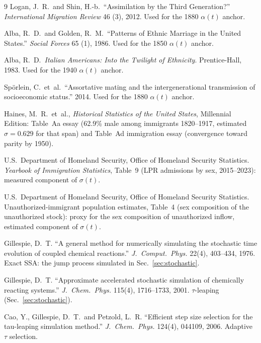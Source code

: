 \documentclass[11pt,a4paper]{article}
\begin{document}
{\begin{thebibliography}{9}
Logan, J.\ R.\ and Shin, H.-b.\ ``Assimilation by the Third
Generation?'' \textit{International Migration Review} 46 (3), 2012.
Used for the 1880 $\alpha(t)$ anchor.

Alba, R.\ D.\ and Golden, R.\ M.\ ``Patterns of Ethnic Marriage in the
United States.'' \textit{Social Forces} 65 (1), 1986. Used for the 1850
$\alpha(t)$ anchor.

Alba, R.\ D.\ \textit{Italian Americans: Into the Twilight of
Ethnicity}. Prentice-Hall, 1983. Used for the 1940 $\alpha(t)$ anchor.

Sp\"orlein, C.\ et~al.\ ``Assortative mating and the intergenerational
transmission of socioeconomic status.'' 2014. Used for the 1880
$\alpha(t)$ anchor.

Haines, M.\ R.\ et~al., \textit{Historical Statistics of the United
States}, Millennial Edition: Table~Aa essay (62.9\% male among
immigrants 1820--1917, estimated $\sigma=0.629$ for that span) and
Table~Ad immigration essay (convergence toward parity by 1950).

U.S.\ Department of Homeland Security, Office of Homeland Security
Statistics. \textit{Yearbook of Immigration Statistics}, Table~9 (LPR
admissions by sex, 2015--2023): measured component of $\sigma(t)$.

U.S.\ Department of Homeland Security, Office of Homeland Security
Statistics. Unauthorized-immigrant population estimates, Table~4
(sex composition of the unauthorized stock): proxy for the sex
composition of unauthorized inflow, estimated component of
$\sigma(t)$.

Gillespie, D.~T. ``A general method for numerically simulating the
stochastic time evolution of coupled chemical reactions.''
\textit{J.\ Comput.\ Phys.} 22(4), 403--434, 1976.  Exact SSA: the
jump process simulated in Sec.~\ref{sec:stochastic}.

Gillespie, D.~T. ``Approximate accelerated stochastic simulation of
chemically reacting systems.'' \textit{J.\ Chem.\ Phys.} 115(4),
1716--1733, 2001.  $\tau$-leaping (Sec.~\ref{sec:stochastic}).

Cao, Y., Gillespie, D.~T.\ and Petzold, L.~R. ``Efficient step size
selection for the tau-leaping simulation method.'' \textit{J.\ Chem.\
Phys.} 124(4), 044109, 2006.  Adaptive $\tau$ selection.


\end{thebibliography}}
\end{document}
